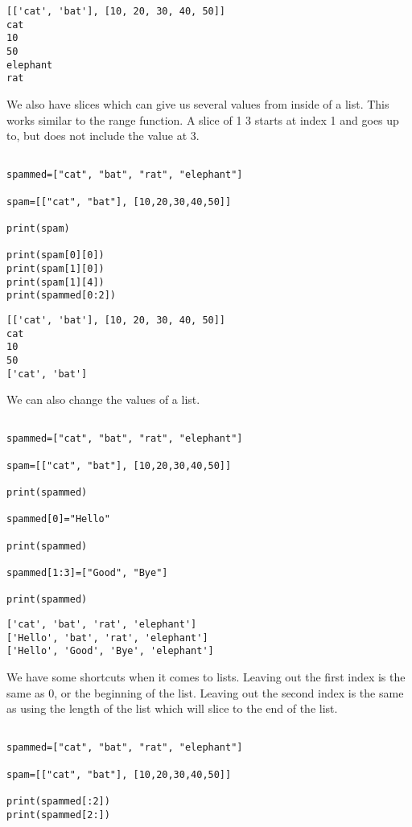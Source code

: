 \documentclass[11pt]{article}
\begin{document}
\begin{verbatim}
[['cat', 'bat'], [10, 20, 30, 40, 50]]
cat
10
50
elephant
rat
\end{verbatim}


We also have slices which can give us several values from inside of a list. This works similar to the range function. A slice of 1 3 starts at index 1 and goes up to, but does not include the value at 3.

\begin{verbatim}

spammed=["cat", "bat", "rat", "elephant"]

spam=[["cat", "bat"], [10,20,30,40,50]]

print(spam)

print(spam[0][0])
print(spam[1][0])
print(spam[1][4])
print(spammed[0:2])

\end{verbatim}

\begin{verbatim}
[['cat', 'bat'], [10, 20, 30, 40, 50]]
cat
10
50
['cat', 'bat']
\end{verbatim}



We can also change the values of a list.


\begin{verbatim}

spammed=["cat", "bat", "rat", "elephant"]

spam=[["cat", "bat"], [10,20,30,40,50]]

print(spammed)

spammed[0]="Hello"

print(spammed)

spammed[1:3]=["Good", "Bye"]

print(spammed)

\end{verbatim}

\begin{verbatim}
['cat', 'bat', 'rat', 'elephant']
['Hello', 'bat', 'rat', 'elephant']
['Hello', 'Good', 'Bye', 'elephant']
\end{verbatim}


We have some shortcuts when it comes to lists. Leaving out the first index is the same as 0, or the beginning of the list. Leaving out the second index is the same as using the length of the list which will slice to the end of the list.


\begin{verbatim}

spammed=["cat", "bat", "rat", "elephant"]

spam=[["cat", "bat"], [10,20,30,40,50]]

print(spammed[:2])
print(spammed[2:])

\end{verbatim}
\end{document}
